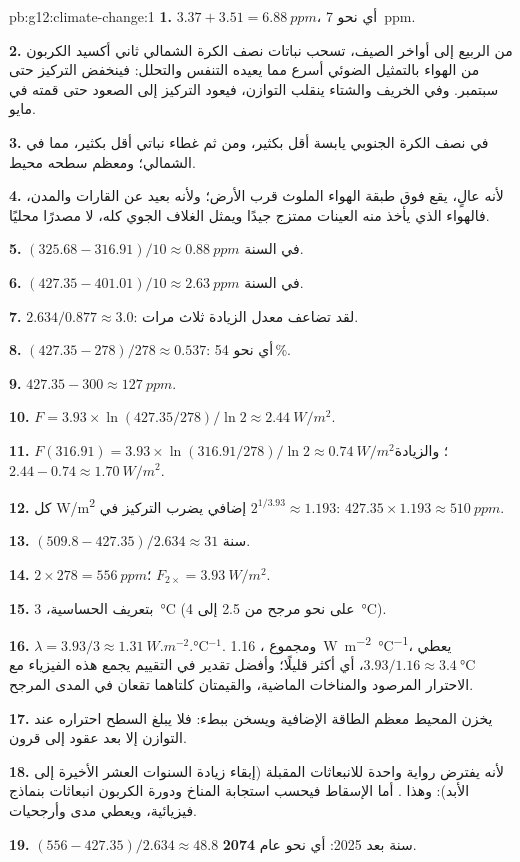 \begin{solution}{pb:g12:climate-change:1}
\textbf{1.} $3.37 + 3.51 = \qty{6.88}{ppm}$، أي نحو \qty{7}{ppm}.

\textbf{2.} من الربيع إلى أواخر الصيف، تسحب نباتات نصف الكرة
الشمالي ثاني أكسيد الكربون من الهواء بالتمثيل الضوئي أسرع مما
يعيده التنفس والتحلل: فينخفض التركيز حتى سبتمبر.
وفي الخريف والشتاء ينقلب التوازن، فيعود التركيز إلى الصعود
حتى قمته في مايو.

\textbf{3.} في نصف الكرة الجنوبي يابسة أقل بكثير، ومن ثم غطاء نباتي
أقل بكثير، مما في الشمالي؛ ومعظم سطحه محيط.

\textbf{4.} لأنه عالٍ، يقع فوق طبقة الهواء الملوث قرب
الأرض؛ ولأنه بعيد عن القارات والمدن، فالهواء الذي يأخذ منه العينات ممتزج جيدًا
ويمثل الغلاف الجوي كله، لا مصدرًا محليًا.

\textbf{5.} $(325.68 - 316.91)/10 \approx \qty{0.88}{ppm}$ في السنة.

\textbf{6.} $(427.35 - 401.01)/10 \approx \qty{2.63}{ppm}$ في السنة.

\textbf{7.} $2.634/0.877 \approx 3.0$: لقد تضاعف معدل الزيادة ثلاث مرات.

\textbf{8.} $(427.35 - 278)/278 \approx 0.537$: أي نحو 54\,\%.

\textbf{9.} $427.35 - 300 \approx \qty{127}{ppm}$.

\textbf{10.} $F = 3.93 \times \ln(427.35/278)/\ln 2 \approx
\qty{2.44}{W/m^2}$.

\textbf{11.} $F(316.91) = 3.93 \times \ln(316.91/278)/\ln 2 \approx
\qty{0.74}{W/m^2}$؛ والزيادة $2.44 - 0.74 \approx \qty{1.70}{W/m^2}$.

\textbf{12.} كل \unit{W/m^2} إضافي يضرب التركيز في
$2^{1/3.93} \approx 1.193$: $427.35 \times 1.193 \approx \qty{510}{ppm}$.

\textbf{13.} $(509.8 - 427.35)/2.634 \approx 31$ سنة.

\textbf{14.} $2 \times 278 = \qty{556}{ppm}$؛  $F_{2\times} =
\qty{3.93}{W/m^2}$.

\textbf{15.} بتعريف الحساسية، \qty{3}{\degreeCelsius}
(على نحو مرجح من 2.5 إلى \qty{4}{\degreeCelsius}).

\textbf{16.} $\lambda = 3.93/3 \approx \qty{1.31}{W.m^{-2}.\degreeCelsius^{-1}}$.
ومجموع ، \qty{1.16}{W.m^{-2}.\degreeCelsius^{-1}}، يعطي
$3.93/1.16 \approx \qty{3.4}{\degreeCelsius}$، أي أكثر قليلًا؛ وأفضل تقدير
في التقييم يجمع هذه الفيزياء مع الاحترار المرصود والمناخات
الماضية، والقيمتان كلتاهما تقعان في المدى المرجح.

\textbf{17.} يخزن المحيط معظم الطاقة الإضافية ويسخن ببطء: فلا يبلغ
السطح احتراره عند التوازن إلا بعد عقود إلى قرون.

\textbf{18.} لأنه يفترض رواية واحدة للانبعاثات المقبلة (إبقاء زيادة
السنوات العشر الأخيرة إلى الأبد): وهذا . أما الإسقاط فيحسب
استجابة المناخ ودورة الكربون  انبعاثات
بنماذج فيزيائية، ويعطي مدى وأرجحيات.

\textbf{19.} $(556 - 427.35)/2.634 \approx 48.8$ سنة بعد 2025: أي نحو
عام \textbf{2074}.
\end{solution}
